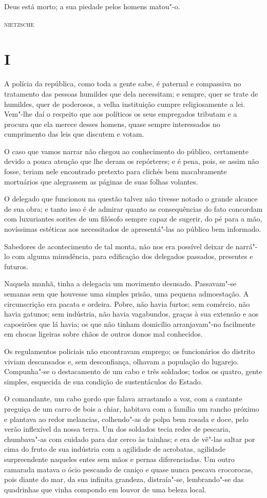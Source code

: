 \epigraph{Deus está morto; a sua piedade pelos homens matou"-o.}{\textsc{nietzsche}}

\section{I}

\noindent{}A polícia da república, como toda a gente sabe, é paternal e compassiva
no tratamento das pessoas humildes que dela necessitam; e sempre, quer
se trate de humildes, quer de poderosos, a velha instituição cumpre
religiosamente a lei. Vem"-lhe daí o respeito que aos políticos os seus
empregados tributam e a procura que ela merece desses homens, quase
sempre interessados no cumprimento das leis que discutem e votam.

O caso que vamos narrar não chegou ao conhecimento do público,
certamente devido a pouca atenção que lhe deram os repórteres; e é pena,
pois, se assim não fosse, teriam nele encontrado pretexto para clichés
bem macabramente mortuários que alegrassem as páginas de suas folhas
volantes.

O delegado que funcionou na questão talvez não tivesse notado o grande
alcance de sua obra; e tanto isso é de admirar quanto as consequências
do fato concordam com luxuriantes sorites de um filósofo sempre capaz de
sugerir, do pé para a mão, novíssimas estéticas aos necessitados de
apresentá"-las ao público bem informado.

Sabedores de acontecimento de tal monta, não nos era possível deixar de
narrá"-lo com alguma minudência, para edificação dos delegados passados,
presentes e futuros.

Naquela manhã, tinha a delegacia um movimento desusado. Passavam"-se
semanas sem que houvesse uma simples prisão, uma pequena admoestação. A
circunscrição era pacata e ordeira. Pobre, não havia furtos; sem
comércio, não havia gatunos; sem indústria, não havia vagabundos, graças
à sua extensão e aos capoeirões que lá havia; os que não tinham
domicílio arranjavam"-no facilmente em chocas ligeiras sobre chãos de
outros donos mal conhecidos.

Os regulamentos policiais não encontravam emprego; os funcionários do
distrito viviam descansados e, sem desconfiança, olhavam a população do
lugarejo. Compunha"-se o destacamento de um cabo e três soldados; todos
os quatro, gente simples, esquecida de sua condição de sustentáculos do
Estado.

O comandante, um cabo gordo que falava arrastando a voz, com a cantante
preguiça de um carro de bois a chiar, habitava com a família um rancho
próximo e plantava ao redor melancias, colhendo"-as de polpa bem rosada e
doce, pelo verão inflexível da nossa terra. Um dos soldados tecia redes
de pescaria, chumbava"-as com cuidado para dar cerco às tainhas; e era de
vê"-las saltar por cima do fruto de sua indústria com a agilidade de
acrobatas, agilidade surpreendente naqueles entes sem mãos e pernas
diferenciadas. Um outro camarada matava o ócio pescando de caniço e
quase nunca pescava crocorocas, pois diante do mar, da sua infinita
grandeza, distraía"-se, lembrando"-se das quadrinhas que vinha compondo em
louvor de uma beleza local.

